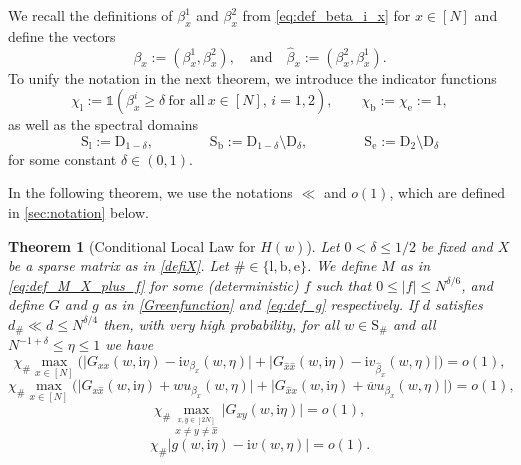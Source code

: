 \documentclass[11pt]{article}
\newcommand{\ii}{\mathrm{i}}
\newcommand{\abs}[1]{\left| #1 \right|}
\newcommand{\absb}[1]{\bigl| #1 \bigr|}
\theoremstyle{plain}
\newtheorem{thm}[thhm]{Theorem}
\theoremstyle{remark}
\numberwithin{equation}{section}
\newcommand*\ubarr[1]{{\widehat{#1}}}
\begin{document}
	We recall the definitions of $\beta_x^1$ and $\beta_x^2$ from \cref{eq:def_beta_i_x} for $x \in [N]$ and define the vectors 
	\[ \beta_x:= (\beta^1_x,\beta^2_x), \quad \text{and} \quad   \ubarr{\beta}_x := (\beta^2_x,\beta^1_x). \]
To unify the notation in the next theorem, we introduce the indicator functions 
\begin{equation} \label{eq:def_chi} 
	\chi_{\mathrm{l}}:= \mathds{1}\left( \beta_{x}^i \ge \delta~\text{for all}~ x\in [N],\, i =1,2\right), \qquad \chi_\mathrm{b} := \chi_\mathrm{e} := 1, 
	\end{equation} 
	as well as the spectral domains 
	\begin{equation} \label{eq:def_spectral} 
	\mathrm{S}_{\mathrm{l}} := \mathrm{D}_{1-\delta}, \qquad \qquad 
	\mathrm{S}_{\mathrm{b}} := 	\mathrm{D}_{1-\delta}\setminus \mathrm{D}_\delta, \qquad \qquad 
	\mathrm{S}_\mathrm{e} := \mathrm{D}_2\setminus \mathrm{D}_\delta 
	\end{equation} 
	for some constant $\delta \in (0,1)$. 
	
In the following theorem, we use the notations $\ll$ and $o(1)$, which are defined in \cref{sec:notation} below. 	

		\begin{thm}[Conditional Local Law for $H(w)$]\label{thm:locallaw_H}
		Let $ 0 < \delta \le 1/2$ be fixed and $X$ be a sparse matrix as in  \cref{defiX}. 
		Let $\# \in \{\mathrm{l}, \mathrm{b}, \mathrm{e}\}$.    
		We define $M$ as in \cref{eq:def_M_X_plus_f} for some (deterministic) $f$ such that $0 \le \abs{f} \le N^{\delta/6}$, and define $G$ and $g$ as in \cref{Greenfunction} and \cref{eq:def_g} respectively. 
		If $d$ satisfies $d_\# \ll d \leq N^{\delta/4}$ then, with very high probability, for all $w \in \mathrm{S}_\#$ and all $ N^{-1 + \delta} \le \eta \le 1$ we have
		\begin{equation}%
			\chi_\# \max_{x \in [N]} \Big( \absb{G_{xx}(w,\ii \eta) - \ii v_{\beta_x}(w,\eta)} +
			\absb{G_{\ubarr{x}\ubarr{x}}(w,\ii \eta) - \ii v_{\ubarr{\beta}_x}(w,\eta)}
			\Big) =o(1) ,
		\end{equation}
		\begin{equation}%
			\chi_\# \max_{x \in [N]} \Big(
			\absb{G_{x\ubarr{x}}(w,\ii\eta) + w u_{\beta_x}(w,\eta)} 
			+ \absb{G_{\ubarr{x}x}(w,\ii\eta) + \overline{w} u_{{\beta}_x}(w,\eta)} \Big)  =o(1),
		\end{equation}
		\begin{equation}%
			\chi_\#  \max_{\stackrel{x,y \in [2N]}{x \neq y \neq \ubarr{x}}}\absb{G_{xy}(w, \ii \eta)}  =o(1),
		\end{equation}
		\begin{equation}%
			\chi_\#  \absb{g(w,\ii \eta) - \ii v(w,\eta)}  =o(1).
		\end{equation}
	\end{thm}
	
\end{document}
